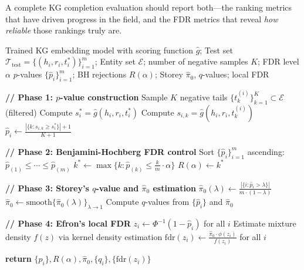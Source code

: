 A complete KG completion evaluation should report both---the ranking metrics that have driven progress in the field, and the FDR metrics that reveal \emph{how reliable} those rankings truly are.

\begin{algorithm}[t]
\caption{FDR-Based KG Completion Evaluation Protocol}
\label{alg:fdr-kg}
\begin{algorithmic}[1]
\Require Trained KG embedding model with scoring function $\hat{g}$;
         Test set $\mathcal{T}_{\text{test}} = \{(h_i, r_i, t^*_i)\}_{i=1}^m$;
         Entity set $\mathcal{E}$; number of negative samples $K$; FDR level $\alpha$
\Ensure $p$-values $\{\hat{p}_i\}_{i=1}^m$; BH rejections $R(\alpha)$; Storey $\hat{\pi}_0$, $q$-values; local FDR

\State \textbf{// Phase 1: $p$-value construction}
    \State Sample $K$ negative tails $\{t_k^{(i)}\}_{k=1}^K \subset \mathcal{E}$ (filtered)
    \State Compute $s_i^* = \hat{g}(h_i, r_i, t^*_i)$ 
        \State Compute $s_{i,k} = \hat{g}(h_i, r_i, t^{(i)}_k)$ 
    \EndFor
    \State $\hat{p}_i \gets \frac{|\{k: s_{i,k} \geq s_i^*\}| + 1}{K + 1}$ 
\EndFor

\State \textbf{// Phase 2: Benjamini-Hochberg FDR control}
\State Sort $\{\hat{p}_i\}_{i=1}^m$ ascending: $\hat{p}_{(1)} \leq \cdots \leq \hat{p}_{(m)}$
\State $k^* \gets \max\{k: \hat{p}_{(k)} \leq \frac{k}{m} \cdot \alpha\}$
\State $R(\alpha) \gets k^*$ 

\State \textbf{// Phase 3: Storey's $q$-value and $\hat{\pi}_0$ estimation}
\For{$\lambda \in \Lambda$} 
    \State $\hat{\pi}_0(\lambda) \gets \frac{|\{i: \hat{p}_i > \lambda\}|}{m \cdot (1-\lambda)}$ 
\EndFor
\State $\hat{\pi}_0 \gets \text{smooth}\{\hat{\pi}_0(\lambda)\}_{\lambda \to 1}$ 
\State Compute $q$-values from $\{\hat{p}_i\}$ and $\hat{\pi}_0$

\State \textbf{// Phase 4: Efron's local FDR}
\State $z_i \gets \Phi^{-1}(1 - \hat{p}_i)$ for all $i$ 
\State Estimate mixture density $f(z)$ via kernel density estimation
\State $\text{fdr}(z_i) \gets \frac{\hat{\pi}_0 \cdot \phi(z_i)}{f(z_i)}$ for all $i$ 

\State \textbf{return} $\{\hat{p}_i\}, R(\alpha), \hat{\pi}_0, \{q_i\}, \{\text{fdr}(z_i)\}$
\end{algorithmic}
\end{algorithm}
